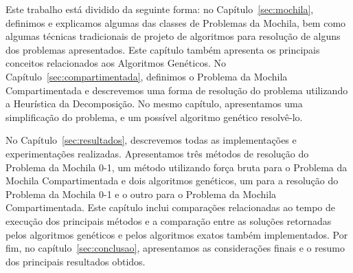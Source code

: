 Este trabalho está dividido da seguinte forma: no Capítulo~\ref{sec:mochila}, definimos e explicamos algumas das classes de Problemas da Mochila, bem como algumas técnicas tradicionais de projeto de algoritmos para resolução de alguns dos problemas apresentados. Este capítulo também apresenta os principais conceitos relacionados aos Algoritmos Genéticos. No Capítulo~\ref{sec:compartimentada}, definimos o Problema da Mochila Compartimentada e descrevemos uma forma de resolução do problema utilizando a Heurística da Decomposição. No mesmo capítulo, apresentamos uma simplificação do problema, e um possível algoritmo genético resolvê-lo.

No Capítulo~\ref{sec:resultados}, descrevemos todas as implementações e experimentações realizadas. Apresentamos três métodos de resolução do Problema da Mochila 0-1, um método utilizando força bruta para o Problema da Mochila Compartimentada e dois algoritmos genéticos, um para a resolução do Problema da Mochila 0-1 e o outro para o Problema da Mochila Compartimentada. Este capítulo inclui comparações relacionadas ao tempo de execução dos principais métodos e a comparação entre as soluções retornadas pelos algoritmos genéticos e pelos algoritmos exatos também implementados. Por fim, no capítulo~\ref{sec:conclusao}, apresentamos as considerações finais e o resumo dos principais resultados obtidos. 

